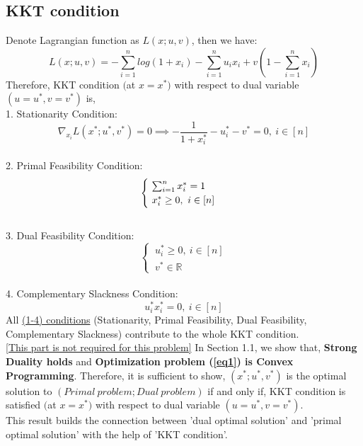 \documentclass{article}
\begin{document}
\subsection{KKT condition}
Denote Lagrangian function as $L(x;u,v)$, then we have:
\begin{equation}
	\nonumber
	L(x;u,v) = -\sum_{i=1}^n log(1+x_i) -\sum_{i=1}^{n} u_i x_i + v(1-\sum_{i=1}^{n}x_i)
\end{equation}
Therefore, KKT condition $($at $x=x^*)$ with respect to dual variable $(u=u^*, v=v^*)$ is,
\vspace{4pt}
\\
1. Stationarity Condition:
\begin{equation}
	\nonumber
	\nabla_{x_i}L(x^*;u^*,v^*) = 0 \implies -\dfrac{1}{1+x_i^{*}} -u_i^* - v^* =0, \ i\in [n]
\end{equation}
\\
2. Primal Feasibility Condition:
\begin{equation}
	\nonumber
	\begin{cases}
		\ \sum_{i=1}^{n}x_i^*=1 \\
		\ x_i^* \ge 0,\ i\in[n]
	\end{cases}
\\
\end{equation}
\\
3. Dual Feasibility Condition:
\begin{equation}
	\nonumber
	\begin{cases}
			\ u_i^* \ge 0,\ i\in[n] \\
		\ v^* \in \mathbb{R}
	\end{cases}
\end{equation}
\\
4. Complementary Slackness Condition:
\begin{equation}
	\nonumber
	u_i^*x_i^*=0,\ i\in [n]
\end{equation}
All \underline{(1-4) conditions} (Stationarity, Primal Feasibility, Dual Feasibility, Complementary Slackness) contribute to the whole KKT condition.
\vspace{4pt}
\\
\underline{[This part is not required for this problem]} In Section 1.1, we show that, \textbf{Strong Duality holds }and \textbf{Optimization problem (\ref{eq1}) is Convex Programming}. Therefore, it is sufficient to show, $(x^*;u^*,v^*)$ is the optimal solution to $(Primal\  problem;Dual \ problem)$ if and only if, KKT condition is satisfied $($at $x=x^*)$ with respect to dual variable $(u=u^*, v=v^*)$.
\vspace{4pt}
\\
This result builds the connection between 'dual optimal solution' and 'primal optimal solution' with the help of 'KKT condition'.
\end{document}
